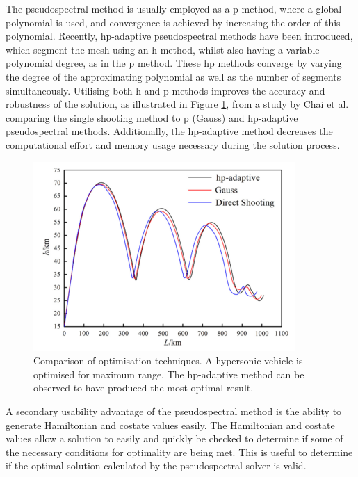 The pseudospectral method is usually employed as a \textsf{p} method, where a global polynomial is used, and convergence is achieved by increasing the order of this polynomial\cite{Rao2009}. Recently, \textsf{hp}-adaptive pseudospectral methods have been introduced, which segment the mesh using an h method, whilst also having a variable polynomial degree, as in the \textsf{p} method\cite{Darby2011a}. These \textsf{hp} methods converge by varying the degree of the approximating polynomial as well as the number of segments simultaneously. Utilising both \textsf{h} and \textsf{p} methods improves the accuracy and robustness of the solution, as illustrated in Figure \ref{fig:OptimisationMethodComparisonChai}, from a study by Chai et al.\cite{Chai2015} comparing the single shooting method to \textsf{p} (Gauss) and \textsf{hp}-adaptive pseudospectral methods. Additionally, the \textsf{hp}-adaptive method decreases the computational effort and memory usage necessary during the solution process\cite{Darby2011a,Chai2015}. 


\begin{figure}[ht]
	\centering
	\includegraphics[width=0.7\linewidth]{figures/2_literature-review/OptimisationMethodComparisonChai}
	\caption{Comparison of optimisation techniques\cite{Chai2015}. A hypersonic vehicle is optimised for maximum range. The \textsf{hp}-adaptive method can be observed to have produced the most optimal result.}
	\label{fig:OptimisationMethodComparisonChai}
\end{figure}

A secondary usability advantage of the pseudospectral method is the ability to generate Hamiltonian and costate values easily\cite{Gong2010,Fahroo2001,Rao2009}. The Hamiltonian and costate values allow a solution to easily and quickly be checked to determine if some of the necessary conditions for optimality are being met. This is useful to determine if the optimal solution calculated by the pseudospectral solver is valid.


